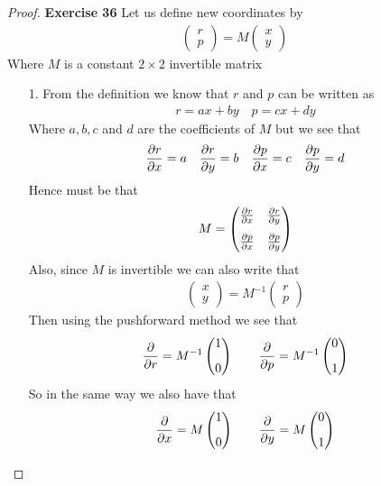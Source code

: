 \documentclass[11pt]{article}
\theoremstyle{definition}
\begin{document}
\cleardoublepage
\begin{proof}{\textbf{Exercise 36}}
Let us define new coordinates by
\begin{align*}
    \begin{pmatrix} r \\ p \end{pmatrix}
    = M  \begin{pmatrix} x \\ y \end{pmatrix}
\end{align*}
Where $M$ is a constant $2\times 2$ invertible matrix
\begin{itemize}
\item [1.] From the definition we know that $r$ and $p$ can be written as
\begin{align*}
    r = ax + by \quad
    p = cx + dy
\end{align*}
Where $a, b, c $ and $d$ are the coefficients of $M$ but we see that
\begin{align*}
    \pdv{r}{x} = a \quad \pdv{r}{y} = b \quad
    \pdv{p}{x} = c \quad \pdv{p}{y} = d
\end{align*}
Hence must be that
\begin{align*}
    M = \begin{pmatrix}
        \pdv{r}{x} & \pdv{r}{y} \\[8pt]
        \pdv{p}{x} & \pdv{p}{y}    
    \end{pmatrix}
\end{align*}
Also, since $M$ is invertible we can also write that
\begin{align*}
    \begin{pmatrix} x \\ y \end{pmatrix}
    = M^{-1}\begin{pmatrix} r \\ p \end{pmatrix}
\end{align*}
Then using the pushforward method we see that
\begin{align*}
    \pdv{}{r} = M^{-1} \begin{pmatrix}
        1 \\[8pt] 0
    \end{pmatrix}\qquad
    \pdv{}{p} = M^{-1} \begin{pmatrix}
        0 \\[8pt] 1
    \end{pmatrix}
\end{align*}
So in the same way we also have that
\begin{align*}
    \pdv{}{x} = M \begin{pmatrix}
        1 \\[8pt] 0
    \end{pmatrix}\qquad
    \pdv{}{y} = M \begin{pmatrix}
        0 \\[8pt] 1
    \end{pmatrix}
\end{align*}


\end{itemize}
\end{proof}
\end{document}
